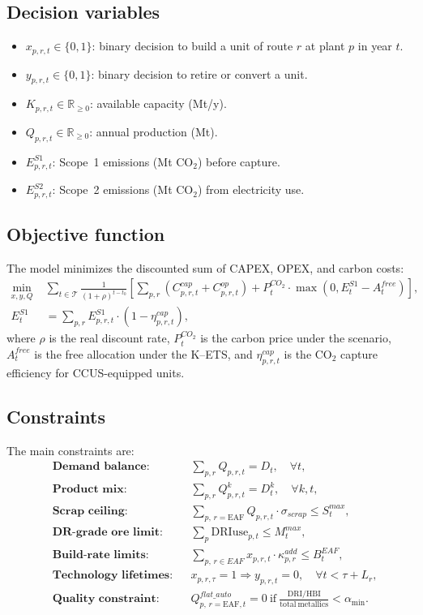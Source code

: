 \documentclass[preprint,5p,authoryear]{elsarticle}
\begin{document}
\subsection{Decision variables}
\begin{itemize}[leftmargin=*]
    \item $x_{p,r,t} \in \{0,1\}$: binary decision to build a unit of route $r$ at plant $p$ in year $t$.
    \item $y_{p,r,t} \in \{0,1\}$: binary decision to retire or convert a unit.
    \item $K_{p,r,t} \in \mathbb{R}_{\ge 0}$: available capacity (Mt/y).
    \item $Q_{p,r,t} \in \mathbb{R}_{\ge 0}$: annual production (Mt).
    \item $E^{S1}_{p,r,t}$: Scope~1 emissions (Mt CO$_2$) before capture.
    \item $E^{S2}_{p,r,t}$: Scope~2 emissions (Mt CO$_2$) from electricity use.
\end{itemize}

\subsection{Objective function}
The model minimizes the discounted sum of CAPEX, OPEX, and carbon costs:
\begin{align}
\min_{x,y,Q} \; & \sum_{t \in \mathcal{T}} \frac{1}{(1+\rho)^{t-t_0}} 
\left[
\sum_{p,r} \left( C^{cap}_{p,r,t} + C^{op}_{p,r,t} \right) 
+ P^{CO_2}_t \cdot \max\left(0, E^{S1}_t - A^{free}_t\right)
\right], \\
E^{S1}_t &= \sum_{p,r} E^{S1}_{p,r,t} \cdot \left( 1 - \eta^{cap}_{p,r,t} \right),
\end{align}
where $\rho$ is the real discount rate, $P^{CO_2}_t$ is the carbon price under the scenario, $A^{free}_t$ is the free allocation under the K--ETS, and $\eta^{cap}_{p,r,t}$ is the CO$_2$ capture efficiency for CCUS-equipped units.

\subsection{Constraints}
The main constraints are:
\begin{align}
&\textbf{Demand balance:} && \sum_{p,r} Q_{p,r,t} = D_t, \quad \forall t, \\
&\textbf{Product mix:} && \sum_{p,r} Q^k_{p,r,t} = D^k_t, \quad \forall k,t, \\
&\textbf{Scrap ceiling:} && \sum_{p,\,r=\mathrm{EAF}} Q_{p,r,t} \cdot \sigma_{scrap} \le S^{max}_t, \\
&\textbf{DR-grade ore limit:} && \sum_{p} \mathrm{DRIuse}_{p,t} \le M^{max}_t, \\
&\textbf{Build-rate limits:} && \sum_{p,\,r\in EAF} x_{p,r,t} \cdot \kappa^{add}_{p,r} \le B^{EAF}_t, \\
&\textbf{Technology lifetimes:} && x_{p,r,\tau} = 1 \Rightarrow y_{p,r,t} = 0, \quad \forall t < \tau+L_r, \\
&\textbf{Quality constraint:} && Q^{flat\_auto}_{p,\,r=\mathrm{EAF},t} = 0 \ \text{if} \ \frac{\mathrm{DRI/HBI}}{\mathrm{total\ metallics}} < \alpha_{\min}.
\end{align}
\end{document}
